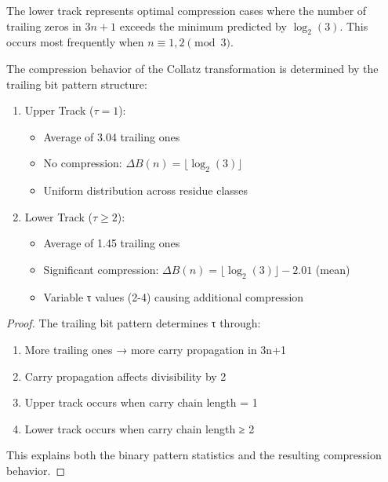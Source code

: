 \begin{corollary}
The lower track represents optimal compression cases where the number of trailing zeros in $3n+1$ exceeds the minimum predicted by $\log_2(3)$. This occurs most frequently when $n \equiv 1,2 \pmod{3}$.
\end{corollary}

\begin{theorem}
The compression behavior of the Collatz transformation is determined by the trailing bit pattern structure:
\begin{enumerate}
\item Upper Track ($\tau = 1$):
   \begin{itemize}
   \item Average of 3.04 trailing ones
   \item No compression: $\Delta B(n) = \lfloor \log_2(3) \rfloor$
   \item Uniform distribution across residue classes
   \end{itemize}
\item Lower Track ($\tau \geq 2$):
   \begin{itemize}
   \item Average of 1.45 trailing ones
   \item Significant compression: $\Delta B(n) = \lfloor \log_2(3) \rfloor - 2.01$ (mean)
   \item Variable τ values (2-4) causing additional compression
   \end{itemize}
\end{enumerate}
\end{theorem}

\begin{proof}
The trailing bit pattern determines τ through:
\begin{enumerate}
\item More trailing ones → more carry propagation in 3n+1
\item Carry propagation affects divisibility by 2
\item Upper track occurs when carry chain length = 1
\item Lower track occurs when carry chain length ≥ 2
\end{enumerate}
This explains both the binary pattern statistics and the resulting compression behavior.
\end{proof} 
